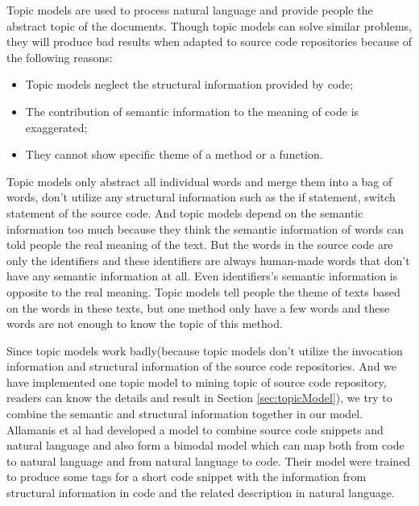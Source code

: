Topic models are used to process natural language and provide people the abstract topic of the documents.
Though topic models can solve similar problems, they will produce bad results when adapted to
source code repositories because of the following reasons:
\begin{itemize}
\item Topic models neglect the structural information provided by code;
\item The contribution of semantic information to the meaning of code is exaggerated;
\item They cannot show specific theme of a method or a function.
\end{itemize}
Topic models only abstract all individual words and merge them into a bag of words, don't utilize any structural information such as the if statement, switch statement of the source code.
And topic models depend on the semantic information too much because they think the semantic information of words can told people the real meaning of the text. But the words in the source code are only the identifiers and these identifiers are always human-made words that don't have any semantic information at all. Even identifiers's semantic information is opposite to the real meaning.
Topic models tell people the theme of texts based on the words in these texts, but one method only have a few words and these words are not enough to know the topic of this method.

Since topic models work badly(because topic models don't utilize the invocation information and structural information of the source code repositories. And we have implemented one topic model to mining topic of source code repository, readers can know the details and result in Section \ref{sec:topicModel}), %
we try to combine the semantic and structural information together
in our model. Allamanis et al\cite{allamanis2015bimodal} had developed a model to combine
source code snippets and natural language and also form a bimodal model which can map both from code to natural
language and from natural language to code. Their model were trained to produce some tags for a short
code snippet with the information from structural information in code and the related description in natural
language.


